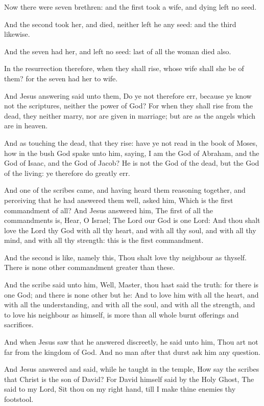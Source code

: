 \Verse Now there were seven brethren: and the first took a wife, and dying left no seed.

\Verse And the second took her, and died, neither left he any seed: and the third likewise.

\Verse And the seven had her, and left no seed: last of all the woman died also.

\Verse In the resurrection therefore, when they shall rise, whose wife shall she be of them? for the seven had her to wife.

\Verse And Jesus answering said unto them, Do ye not therefore err, because ye know not the scriptures, neither the power of God?  \Verse For when they shall rise from the dead, they neither marry, nor are given in marriage; but are as the angels which are in heaven.

\Verse And as touching the dead, that they rise: have ye not read in the book of Moses, how in the bush God spake unto him, saying, I am the God of Abraham, and the God of Isaac, and the God of Jacob?  \Verse He is not the God of the dead, but the God of the living: ye therefore do greatly err.

\Verse And one of the scribes came, and having heard them reasoning together, and perceiving that he had answered them well, asked him, Which is the first commandment of all?  \Verse And Jesus answered him, The first of all the commandments is, Hear, O Israel; The Lord our God is one Lord: \Verse And thou shalt love the Lord thy God with all thy heart, and with all thy soul, and with all thy mind, and with all thy strength: this is the first commandment.

\Verse And the second is like, namely this, Thou shalt love thy neighbour as thyself. There is none other commandment greater than these.

\Verse And the scribe said unto him, Well, Master, thou hast said the truth: for there is one God; and there is none other but he: \Verse And to love him with all the heart, and with all the understanding, and with all the soul, and with all the strength, and to love his neighbour as himself, is more than all whole burnt offerings and sacrifices.

\Verse And when Jesus saw that he answered discreetly, he said unto him, Thou art not far from the kingdom of God. And no man after that durst ask him any question.

\Verse And Jesus answered and said, while he taught in the temple, How say the scribes that Christ is the son of David?  \Verse For David himself said by the Holy Ghost, The \LORD said to my Lord, Sit thou on my right hand, till I make thine enemies thy footstool.

